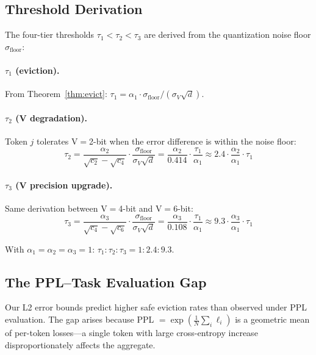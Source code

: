 \subsection{Threshold Derivation}
\label{sec:threshold-derivation}

The four-tier thresholds $\tau_1 < \tau_2 < \tau_3$ are derived from the quantization noise floor $\sigma_{\text{floor}}$:

\paragraph{$\tau_1$ (eviction).} From Theorem~\ref{thm:evict}: $\tau_1 = \alpha_1 \cdot \sigma_{\text{floor}} / (\sigma_V \sqrt{d})$.

\paragraph{$\tau_2$ (V degradation).} Token $j$ tolerates V$=$2-bit when the error difference is within the noise floor:
\begin{equation}
    \tau_2 = \frac{\alpha_2}{\sqrt{c_2} - \sqrt{c_4}} \cdot \frac{\sigma_{\text{floor}}}{\sigma_V\sqrt{d}} = \frac{\alpha_2}{0.414} \cdot \frac{\tau_1}{\alpha_1} \approx 2.4 \cdot \frac{\alpha_2}{\alpha_1} \cdot \tau_1
\end{equation}

\paragraph{$\tau_3$ (V precision upgrade).} Same derivation between V$=$4-bit and V$=$6-bit:
\begin{equation}
    \tau_3 = \frac{\alpha_3}{\sqrt{c_4} - \sqrt{c_6}} \cdot \frac{\sigma_{\text{floor}}}{\sigma_V\sqrt{d}} = \frac{\alpha_3}{0.108} \cdot \frac{\tau_1}{\alpha_1} \approx 9.3 \cdot \frac{\alpha_3}{\alpha_1} \cdot \tau_1
\end{equation}

With $\alpha_1 = \alpha_2 = \alpha_3 = 1$: $\tau_1 : \tau_2 : \tau_3 = 1 : 2.4 : 9.3$.

\subsection{The PPL--Task Evaluation Gap}
\label{sec:ppl-gap}

Our L2 error bounds predict higher safe eviction rates than observed under PPL evaluation. The gap arises because PPL $= \exp\left(\frac{1}{N}\sum_i \ell_i\right)$ is a geometric mean of per-token losses---a single token with large cross-entropy increase disproportionately affects the aggregate.

